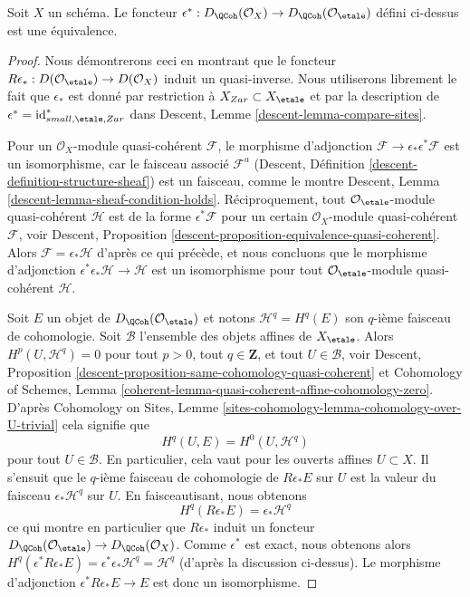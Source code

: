 \begin{lemma}
\label{lemma-derived-quasi-coherent-small-etale-site}
Soit $X$ un schéma. Le foncteur
$\epsilon^* : D_\QCoh(\mathcal{O}_X) \to
D_\QCoh(\mathcal{O}_\etale)$
défini ci-dessus est une équivalence.
\end{lemma}

\begin{proof}
Nous démontrerons ceci en montrant que le foncteur
$R\epsilon_* : D(\mathcal{O}_\etale) \to D(\mathcal{O}_X)$
induit un quasi-inverse. Nous utiliserons librement le fait que $\epsilon_*$
est donné par restriction à $X_{Zar} \subset X_\etale$ et par la description de
$\epsilon^* = \text{id}_{small, \etale, Zar}^*$
dans Descent, Lemme \ref{descent-lemma-compare-sites}.

\medskip\noindent
Pour un $\mathcal{O}_X$-module quasi-cohérent $\mathcal{F}$, le morphisme d'adjonction
$\mathcal{F} \to \epsilon_*\epsilon^*\mathcal{F}$ est un isomorphisme, car
le faisceau associé $\mathcal{F}^a$
(Descent, Définition \ref{descent-definition-structure-sheaf})
est un faisceau, comme le montre
Descent, Lemma \ref{descent-lemma-sheaf-condition-holds}.
Réciproquement, tout $\mathcal{O}_\etale$-module quasi-cohérent
$\mathcal{H}$ est de la forme $\epsilon^*\mathcal{F}$ pour un certain
$\mathcal{O}_X$-module quasi-cohérent $\mathcal{F}$, voir
Descent, Proposition \ref{descent-proposition-equivalence-quasi-coherent}.
Alors $\mathcal{F} = \epsilon_*\mathcal{H}$ d'après ce qui précède, et
nous concluons que le morphisme d'adjonction
$\epsilon^*\epsilon_*\mathcal{H} \to \mathcal{H}$ est un isomorphisme pour tout
$\mathcal{O}_\etale$-module quasi-cohérent $\mathcal{H}$.

\medskip\noindent
Soit $E$ un objet de $D_\QCoh(\mathcal{O}_\etale)$
et notons $\mathcal{H}^q = H^q(E)$ son $q$-ième faisceau de cohomologie.
Soit $\mathcal{B}$ l'ensemble des objets affines de $X_\etale$.
Alors $H^p(U, \mathcal{H}^q) = 0$ pour tout $p > 0$, tout $q \in \mathbf{Z}$,
et tout $U \in \mathcal{B}$, voir
Descent, Proposition \ref{descent-proposition-same-cohomology-quasi-coherent}
et
Cohomology of Schemes, Lemma
\ref{coherent-lemma-quasi-coherent-affine-cohomology-zero}.
D'après Cohomology on Sites, Lemme
\ref{sites-cohomology-lemma-cohomology-over-U-trivial}
cela signifie que
$$
H^q(U, E) = H^0(U, \mathcal{H}^q)
$$
pour tout $U \in \mathcal{B}$. En particulier, cela vaut pour les ouverts affines
$U \subset X$. Il s'ensuit que le $q$-ième faisceau de cohomologie de
$R\epsilon_*E$ sur $U$ est la valeur du faisceau $\epsilon_*\mathcal{H}^q$
sur $U$. En faisceautisant, nous obtenons
$$
H^q(R\epsilon_*E) = \epsilon_*\mathcal{H}^q
$$
ce qui montre en particulier que $R\epsilon_*$ induit un foncteur
$D_\QCoh(\mathcal{O}_\etale) \to D_\QCoh(\mathcal{O}_X)$.
Comme $\epsilon^*$ est exact, nous obtenons alors
$H^q(\epsilon^*R\epsilon_*E) = \epsilon^*\epsilon_*\mathcal{H}^q =
\mathcal{H}^q$ (d'après la discussion ci-dessus). Le morphisme d'adjonction
$\epsilon^*R\epsilon_*E \to E$ est donc un isomorphisme.


\end{proof}
